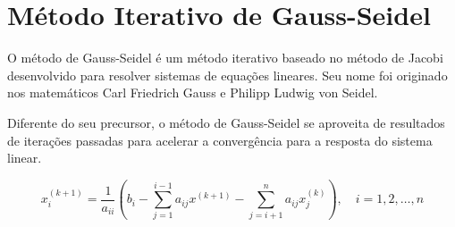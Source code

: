 \chapter{Método Iterativo de Gauss-Seidel}
O método de Gauss-Seidel é um método iterativo baseado no método de Jacobi desenvolvido para resolver sistemas de equações lineares. Seu nome foi originado nos matemáticos Carl Friedrich Gauss e Philipp Ludwig von Seidel.

Diferente do seu precursor, o método de Gauss-Seidel se aproveita de resultados de iterações passadas para acelerar a convergência para a resposta do sistema linear.

\[x_i^{(k+1)} = \dfrac{1}{a_{ii}}\left(b_i - \sum_{j=1}^{i-1}{a_{ij}x^{(k+1)}} - \sum_{j=i+1}^{n}{a_{ij}x_{j}^{(k)}}\right), \quad i = 1, 2, \ldots, n\]